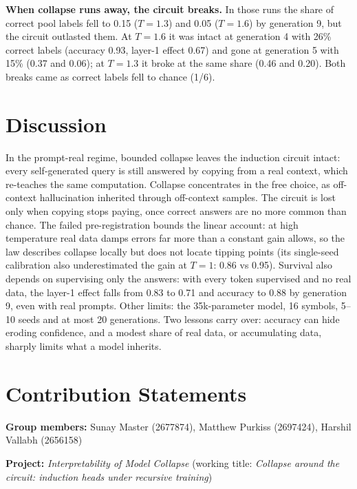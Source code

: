 \documentclass[10pt,letterpaper]{article}
\begin{document}
\textbf{When collapse runs away, the circuit breaks.} In those runs the share of correct pool labels fell to 0.15 ($T{=}1.3$) and 0.05 ($T{=}1.6$) by generation 9, but the circuit outlasted them. At $T{=}1.6$ it was intact at generation 4 with 26\% correct labels (accuracy 0.93, layer-1 effect 0.67) and gone at generation 5 with 15\% (0.37 and 0.06); at $T{=}1.3$ it broke at the same share (0.46 and 0.20). Both breaks came as correct labels fell to chance (1/6).

\section{Discussion}
In the prompt-real regime, bounded collapse leaves the induction circuit intact: every self-generated query is still answered by copying from a real context, which re-teaches the same computation. Collapse concentrates in the free choice, as off-context hallucination inherited through off-context samples. The circuit is lost only when copying stops paying, once correct answers are no more common than chance. The failed pre-registration bounds the linear account: at high temperature real data damps errors far more than a constant gain allows, so the law describes collapse locally but does not locate tipping points (its single-seed calibration also underestimated the gain at $T{=}1$: 0.86 vs 0.95). Survival also depends on supervising only the answers: with every token supervised and no real data, the layer-1 effect falls from 0.83 to 0.71 and accuracy to 0.88 by generation 9, even with real prompts. Other limits: the 35k-parameter model, 16 symbols, 5--10 seeds and at most 20 generations. Two lessons carry over: accuracy can hide eroding confidence, and a modest share of real data, or accumulating data, sharply limits what a model inherits.

\onecolumn
\section{Contribution Statements}
\begingroup\setlength{\parindent}{0pt}\setlength{\parskip}{0.3em}\setlength{\itemsep}{0pt}\renewcommand{\itemize}{\begingroup\list{\textbullet}{\setlength{\itemsep}{1pt}\setlength{\parsep}{0pt}\setlength{\topsep}{2pt}}}\renewcommand{\enditemize}{\endlist\endgroup}

\textbf{Group members:} Sunay Master (2677874), Matthew Purkiss (2697424), Harshil Vallabh (2656158)

\textbf{Project:} \emph{Interpretability of Model Collapse} (working title: \emph{Collapse around the circuit: induction heads under recursive training})
\end{document}
